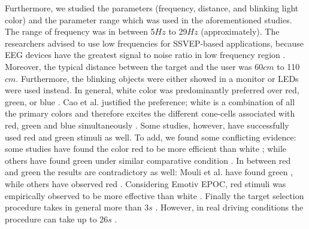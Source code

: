 \documentclass{svmult}
\begin{document}
Furthermore, we studied the parameters (frequency, distance, and blinking light color) and the parameter range which was used in the aforementioned studies. The range of frequency was in between 5$Hz$ to 29$Hz$ (approximately). The researchers advised to use low frequencies for SSVEP-based applications, because EEG devices have the greatest signal to noise ratio in low frequency region \cite{paper6}. Moreover, the typical distance between the target and the user was 60$cm$ to 110$cm$. Furthermore, the blinking objects were either showed in a monitor or LEDs were used instead. In general, white color was predominantly preferred over red, green, or blue \cite{paper6,  aljshamee2014beyond, aljshamee2016discriminate, cao2012flashing, paper2}. Cao et al. justified the preference; white is a combination of all the primary colors and therefore excites the different cone-cells associated with red, green and blue simultaneously \cite{cao2012flashing}. Some studies, however, have successfully used red \cite{paper_5, jian2014improving, paper4} and green \cite{chua2004effects, duvinage2013performance, SSVEPfiability, hvaring2014comparison, paper4, mouli2013performance} stimuli as well. To add, we found some conflicting evidence: some studies have found the color red to be more efficient than white \cite{paper_5, hvaring2014comparison}; while others have found green under similar comparative condition \cite{chua2004effects, duvinage2013performance}. In between red and green the results are contradictory as well: Mouli et al. have found green \cite{mouli2013performance}, while others have observed red \cite{cao2012flashing}. Considering Emotiv EPOC, red stimuli was empirically observed to be more effective than white \cite{hvaring2014comparison}. Finally the target selection procedure takes in general more than 3$s$ \cite{car, SSVEPfiability, jian2014improving, paper4}. However, in real driving conditions the procedure can take up to 26$s$ \cite{car}.
\end{document}

